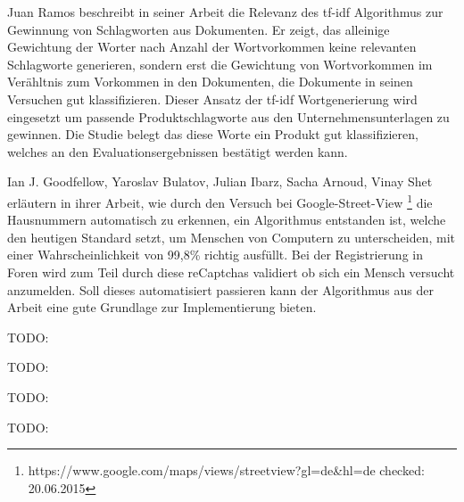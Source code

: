 Juan Ramos \cite{ramos2003using} beschreibt in seiner Arbeit die Relevanz des tf-idf Algorithmus zur Gewinnung von Schlagworten aus Dokumenten. Er zeigt, das alleinige Gewichtung der Worter nach Anzahl der Wortvorkommen  keine relevanten Schlagworte generieren, sondern erst die Gewichtung von Wortvorkommen im Verähltnis zum Vorkommen in den Dokumenten, die Dokumente in seinen Versuchen gut klassifizieren. Dieser Ansatz der tf-idf Wortgenerierung wird eingesetzt um passende Produktschlagworte aus den Unternehmensunterlagen zu gewinnen. Die Studie belegt das diese Worte ein Produkt gut klassifizieren, welches an den Evaluationsergebnissen bestätigt werden kann.

Ian J. Goodfellow, Yaroslav Bulatov, Julian Ibarz, Sacha Arnoud, Vinay Shet \cite{goodfellow2013multi} erläutern in ihrer Arbeit, wie durch den Versuch bei Google-Street-View \footnote{https://www.google.com/maps/views/streetview?gl=de\&hl=de checked: 20.06.2015} die Hausnummern automatisch zu erkennen, ein Algorithmus entstanden ist, welche den heutigen Standard setzt, um Menschen von Computern zu unterscheiden, mit einer Wahrscheinlichkeit von 99,8\% richtig ausfüllt. Bei der Registrierung in Foren wird zum Teil durch diese reCaptchas validiert ob sich ein Mensch versucht anzumelden. Soll dieses automatisiert passieren kann der Algorithmus aus der Arbeit eine gute Grundlage zur Implementierung bieten.

\cite{madhavan2008google} TODO: 

\cite{gupta2014comparative} TODO: 

\cite{jiang2009selectivity} TODO: 

\cite{leopold2002zipfsche} TODO: 